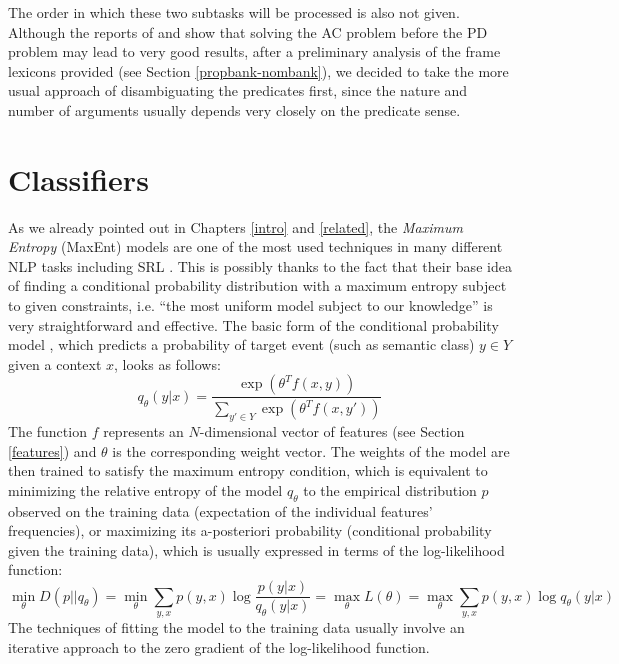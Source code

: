 \documentclass[12pt,notitlepage]{report}
\begin{document}
The order in which these two subtasks will be processed is also not given. Although the reports of \citet{bohnet09} and \citet{zhao09} show that solving the AC problem before the PD problem may lead to very good results, after a preliminary analysis of the frame lexicons provided (see Section \ref{propbank-nombank}), we decided to take the more usual approach of disambiguating the predicates first, since the nature and number of arguments usually depends very closely on the predicate sense.


\section{Classifiers}\label{classifiers}

As we already pointed out in Chapters \ref{intro} and \ref{related}, the \emph{Maximum Entropy} (MaxEnt) models \citep[p. 219ff.]{jelinek97} are one of the most used techniques in many different NLP tasks \citep[p. 607f.]{manning00} including SRL \citep{jiang06,zhao09,che09,chen09}. This is possibly thanks to the fact that their base idea of finding a conditional probability distribution with a maximum entropy \citep[average uncertainty][p. 61]{manning00} subject to given constraints, i.e. ``the most uniform model subject to our knowledge'' \citep[p. 41]{berger96} is very straightforward and effective. The basic form of the conditional probability model \citep{malouf02}, which predicts a probability of target event (such as semantic class) $y\in Y$ given a context $x$, looks as follows: 
\begin{equation}
q_\theta(y|x) = \frac{\exp(\theta^T f(x,y))}{\sum_{y'\in Y} \exp(\theta^T f(x,y'))}
\end{equation}
The function $f$ represents an $N$-dimensional vector of features (see Section \ref{features}) and $\theta$ is the corresponding weight vector. The weights of the model are then trained to satisfy the maximum entropy condition, which is equivalent to minimizing the relative entropy \citep[or Kullback-Leibler Divergence][p. 72]{manning00} of the model $q_\theta$ to the empirical distribution $p$ observed on the training data (expectation of the individual features' frequencies), or maximizing its a-posteriori probability (conditional probability given the training data), which is usually expressed in terms of the log-likelihood function:
\begin{equation}\label{eq:maxent}
\min_\theta D(p||q_\theta) = \min_\theta \sum_{y,x} p(y,x) \log\frac{p(y|x)}{q_\theta(y|x)} = \max_\theta L(\theta) = \max_\theta \sum_{y,x} p(y,x) \log q_\theta(y|x)
\end{equation}
The techniques of fitting the model to the training data usually involve an iterative approach to the zero gradient of the log-likelihood function.
\end{document}
